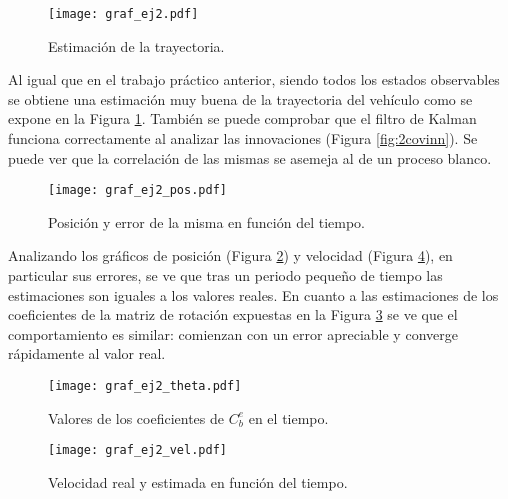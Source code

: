 
\begin{figure}[H]
\centering
\texttt{[image: graf\_ej2.pdf]}
\caption{Estimación de la trayectoria.}
\label{fig:ej2} 
\end{figure}
	Al igual que en el trabajo práctico anterior, siendo todos los estados observables se obtiene una estimación muy buena de la trayectoria del vehículo como se expone en la Figura \ref{fig:ej2}. También se puede comprobar que el filtro de Kalman funciona correctamente al analizar las innovaciones (Figura \ref{fig:2covinn}). Se puede ver que la correlación de las mismas se asemeja al de un proceso blanco.

\begin{figure}[H]
\centering
\texttt{[image: graf\_ej2\_pos.pdf]}
\caption{Posición y error de la misma en función del tiempo.}
\label{fig:2pos} 
\end{figure}

	Analizando los gráficos de posición (Figura \ref{fig:2pos}) y velocidad (Figura \ref{fig:2vel}), en particular sus errores, se ve que tras un periodo pequeño de tiempo las estimaciones son iguales a los valores reales. En cuanto a las estimaciones de los coeficientes de la matriz de rotación expuestas en la Figura \ref{fig:2theta} se ve que el comportamiento es similar: comienzan con un error apreciable y converge rápidamente al valor real.

\pagebreak


\vspace*{\fill}
\begin{figure}[H]
\centering
\texttt{[image: graf\_ej2\_theta.pdf]}
\caption{Valores de los coeficientes de $C^e_b$ en el tiempo.}
\label{fig:2theta} 
\end{figure}


\begin{figure}[H]
\centering
\texttt{[image: graf\_ej2\_vel.pdf]}
\caption{Velocidad real y estimada en función del tiempo.}
\label{fig:2vel} 
\end{figure}
\vspace*{\fill}

